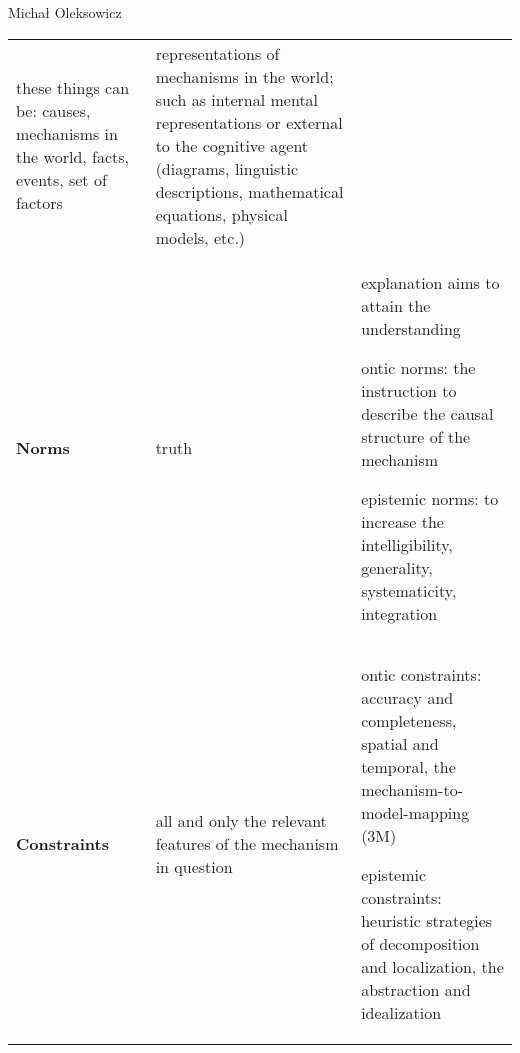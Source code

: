 \begin{artengenv}{Michał Oleksowicz}
\begin{table}[H]
{\begin{tabular}{@{}p{1.9cm}p{3.8cm}p{5.5cm}@{}}
these things can be: causes, mechanisms in the world, facts, events, set of factors &
representations of mechanisms in the world; such as internal mental representations or external to the cognitive agent (diagrams, linguistic descriptions, mathematical equations, physical models, etc.)\\
 \rowcolor[HTML]{ECF4FF} 
{\bfseries Norms} &
truth &
explanation aims to attain the understanding

ontic norms: the instruction to describe the causal structure of the mechanism

epistemic norms: to increase the intelligibility, generality, systematicity, integration\\
  \rowcolor[HTML]{FFFFFF} 
{\bfseries Constraints} &
all and only the relevant features of the mechanism in question

&
ontic constraints: accuracy and completeness, spatial and temporal, the mechanism-to-model-mapping (3M)

epistemic constraints: heuristic strategies of decomposition and localization, the abstraction and idealization\\
\end{tabular}%
}
\end{table}







\end{artengenv}
